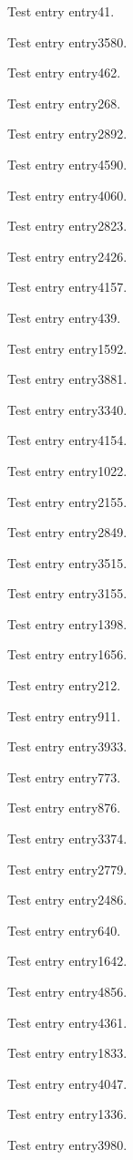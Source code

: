 Test entry \gls{entry41}.

Test entry \gls{entry3580}.

Test entry \gls{entry462}.

Test entry \gls{entry268}.

Test entry \gls{entry2892}.

Test entry \gls{entry4590}.

Test entry \gls{entry4060}.

Test entry \gls{entry2823}.

Test entry \gls{entry2426}.

Test entry \gls{entry4157}.

Test entry \gls{entry439}.

Test entry \gls{entry1592}.

Test entry \gls{entry3881}.

Test entry \gls{entry3340}.

Test entry \gls{entry4154}.

Test entry \gls{entry1022}.

Test entry \gls{entry2155}.

Test entry \gls{entry2849}.

Test entry \gls{entry3515}.

Test entry \gls{entry3155}.

Test entry \gls{entry1398}.

Test entry \gls{entry1656}.

Test entry \gls{entry212}.

Test entry \gls{entry911}.

Test entry \gls{entry3933}.

Test entry \gls{entry773}.

Test entry \gls{entry876}.

Test entry \gls{entry3374}.

Test entry \gls{entry2779}.

Test entry \gls{entry2486}.

Test entry \gls{entry640}.

Test entry \gls{entry1642}.

Test entry \gls{entry4856}.

Test entry \gls{entry4361}.

Test entry \gls{entry1833}.

Test entry \gls{entry4047}.

Test entry \gls{entry1336}.

Test entry \gls{entry3980}.

